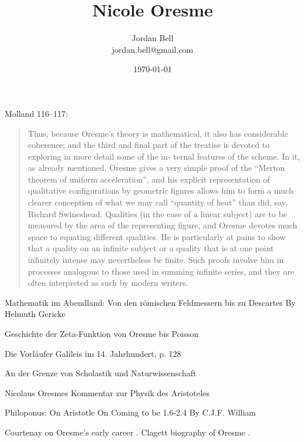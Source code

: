 \documentclass{article}
\theoremstyle{definition}
\begin{document}
\title{Nicole Oresme}
\author{Jordan Bell\\
jordan.bell@gmail.com}
\date{\today}

\maketitle

Molland 116--117:

\begin{quote}
Thus, because Oresme's theory is
mathematical, it also has considerable coherence; and the third and final
part of the treatise is devoted to exploring in more detail some of the in-
ternal features of the scheme. In it, as already mentioned, Oresme gives
a very simple proof of the ``Merton theorem of uniform acceleration'',
and his explicit representation of qualitative configurations by geometric
figures allows him to form a much clearer conception of what we may call
``quantity of heat'' than did, say, Richard Swineshead. Qualities (in the
case of a linear subject) are to be measured by the area of the representing
figure, and Oresme devotes much space to equating different qualities.
He is particularly at pains to show that a quality on an infinite subject or
a quality that is at one point infinitely intense may nevertheless be finite.
Such proofs involve him in processes analogous to those used in summing
infinite series, and they are often interpreted as such by modern writers.
\end{quote}

Mathematik im Abendland: Von den römischen Feldmessern bis zu Descartes
By Helmuth Gericke

Geschichte der Zeta-Funktion von Oresme bis Poisson

Die Vorläufer Galileis im 14. Jahrhundert, p. 128

An der Grenze von Scholastik und Naturwissenschaft

Nicolaus Oresmes Kommentar zur Physik des Aristoteles

Philoponus: On Aristotle On Coming to be 1.6-2.4
By C.J.F. William


Courtenay on Oresme's early career \cite{courtenay}. Clagett biography of Oresme \cite{dictionary}.
 
\end{document}
